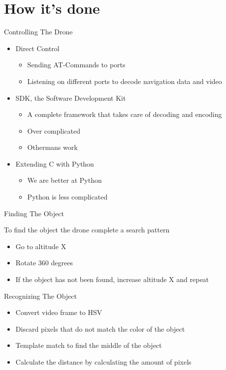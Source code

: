 \documentclass{beamer}
\newcommand{\slide}[2]
{
\begin{frame}
\begin{block}{#1} 

#2

\end{block} \end{frame}
}
\begin{document}
\section{How it's done}
\slide{Controlling The Drone}{
\begin{itemize}
    \item Direct Control
        \begin{itemize}
            \item Sending AT-Commands to ports
            \item Listening on different ports to decode navigation data and video
        \end{itemize}
    \item SDK, the Software Development Kit
        \begin{itemize}
            \item A complete framework that takes care of decoding and encoding
            \item Over complicated
            \item Othermans work
        \end{itemize}
    \item Extending C with Python
        \begin{itemize}
            \item We are better at Python
            \item Python is less complicated 
        \end{itemize}
\end{itemize}
}

\slide{Finding The Object}{
To find the object the drone complete a search pattern
\begin{itemize}
    \item Go to altitude X
    \item Rotate 360 degrees
    \item If the object has not been found, increase altitude X and repeat
\end{itemize}
}

\slide{Recognizing The Object}{
\begin{itemize}
    \item Convert video frame to HSV
    \item Discard pixels that do not match the color of the object
    \item Template match to find the middle of the object
    \item Calculate the distance by calculating the amount of pixels
\end{itemize}
}
\end{document}
